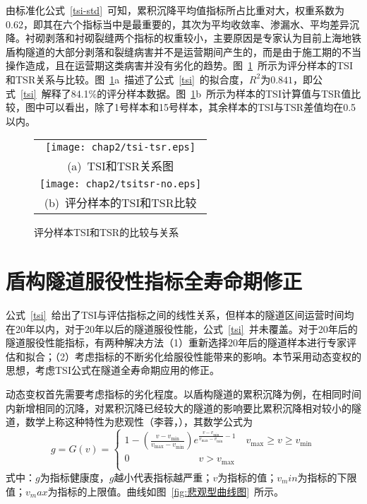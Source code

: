 由标准化公式~\ref{tsi-std}~可知，累积沉降平均值指标所占比重对大，权重系数为0.62，即其在六个指标当中是最重要的，其次为平均收敛率、渗漏水、平均差异沉降。衬砌剥落和衬砌裂缝两个指标的权重较小，主要原因是专家认为目前上海地铁盾构隧道的大部分剥落和裂缝病害并不是运营期间产生的，而是由于施工期的不当操作造成，且在运营期这类病害并没有劣化的趋势。图~\ref{fig:TSI和TSR的比较与关系}~所示为评分样本的TSI和TSR关系与比较。图~\ref{fig:TSI和TSR的比较与关系}a~描述了公式~\ref{tsi}~的拟合度，$R^2$为$0.841$，即公式~\ref{tsi}~解释了84.1\%的评分样本数据。图~\ref{fig:TSI和TSR的比较与关系}b~所示为样本的TSI计算值与TSR值比较，图中可以看出，除了1号样本和15号样本，其余样本的TSI与TSR差值均在0.5以内。

\begin{figure}[htb!] 
    \centering 
    \begin{tabular}{c} 
        \texttt{[image: chap2/tsi-tsr.eps]} \\ 
        (a)~TSI和TSR关系图 \\
        \texttt{[image: chap2/tsitsr-no.eps]} \\ 
        (b)~评分样本的TSI和TSR比较 \\
    \end{tabular}
    \caption{评分样本TSI和TSR的比较与关系} 
    \label{fig:TSI和TSR的比较与关系} 
\end{figure}

\section{盾构隧道服役性指标全寿命期修正}

公式~\ref{tsi}~给出了TSI与评估指标之间的线性关系，但样本的隧道区间运营时间均在20年以内，对于20年以后的隧道服役性能，公式~\ref{tsi}~并未覆盖。对于20年后的隧道服役性能指标，有两种解决方法（1）重新选择20年后的隧道样本进行专家评估和拟合；（2）考虑指标的不断劣化给服役性能带来的影响。本节采用动态变权的思想，考虑TSI公式在隧道全寿命期应用的修正。

动态变权首先需要考虑指标的劣化程度。以盾构隧道的累积沉降为例，在相同时间内新增相同的沉降，对累积沉降已经较大的隧道的影响要比累积沉降相对较小的隧道，数学上称这种特性为悲观性（李蓉，\citeyear{李蓉2007基于层次分析法的桥梁健康状态模糊综合评估方法的研究及其应用}），其数学公式为
\begin{equation}
    g=G(v)=\left\{ \begin{matrix}
   1-\left( \frac{v-{{v}_{\min }}}{{{v}_{\max }}-{{v}_{\min }}} \right){{e}^{\frac{v-{{v}_{\min }}}{{{v}_{\max }}-{{v}_{\min }}}-1}}\quad {{v}_{\max }}\ge v\ge {{v}_{\min }}  \\
   0\quad \quad \quad \quad \quad \quad \quad v>{{v}_{\max }}  \\
\end{matrix} \right.
\end{equation}
式中：$g$为指标健康度，$g$越小代表指标越严重；$v$为指标的值；$v_min$为指标的下限值；$v_max$为指标的上限值。曲线如图~\ref{fig:悲观型曲线图}~所示。

